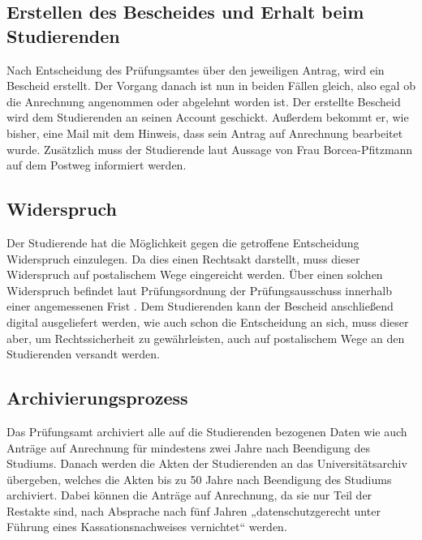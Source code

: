 \subsection{Erstellen des Bescheides und Erhalt beim Studierenden}
Nach Entscheidung des Prüfungsamtes über den jeweiligen Antrag, wird ein Bescheid erstellt. Der Vorgang danach ist nun in beiden Fällen gleich, also egal ob die Anrechnung angenommen oder abgelehnt worden ist. Der erstellte Bescheid wird dem Studierenden an seinen Account geschickt. Außerdem bekommt er, wie bisher, eine Mail mit dem Hinweis, dass sein Antrag auf Anrechnung bearbeitet wurde. Zusätzlich muss der Studierende laut Aussage von Frau Borcea-Pfitzmann auf dem Postweg informiert werden.

\subsection{Widerspruch}
Der Studierende hat die Möglichkeit gegen die getroffene Entscheidung Widerspruch einzulegen. Da dies einen Rechtsakt darstellt, muss dieser Widerspruch auf postalischem Wege eingereicht werden. Über einen solchen Widerspruch befindet laut Prüfungsordnung der Prüfungsausschuss innerhalb einer angemessenen Frist \parencite{pruefungsordnung_ba}. Dem Studierenden kann der Bescheid anschließend digital ausgeliefert werden, wie auch schon die Entscheidung an sich, muss dieser aber, um Rechtssicherheit zu gewährleisten, auch auf postalischem Wege an den Studierenden versandt werden.

\subsection{Archivierungsprozess}
Das Prüfungsamt archiviert alle auf die Studierenden bezogenen Daten wie auch Anträge auf Anrechnung für mindestens zwei Jahre nach Beendigung des Studiums. Danach werden die Akten der Studierenden an das Universitätsarchiv übergeben, welches die Akten bis zu 50 Jahre nach Beendigung des Studiums archiviert. Dabei können die Anträge auf Anrechnung, da sie nur Teil der Restakte sind, nach Absprache nach fünf Jahren „datenschutzgerecht unter Führung eines Kassationsnachweises vernichtet“ \parencite{archivierung} werden.


